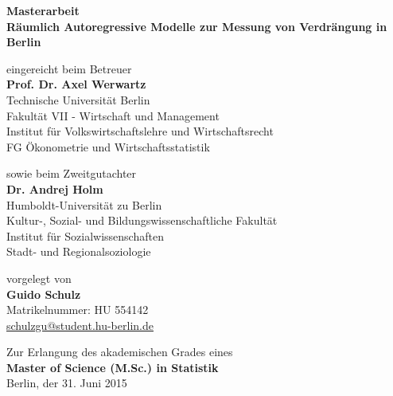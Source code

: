 \begin{center}
    {\normalsize{\bf Masterarbeit}} \\\vspace{0.5cm}
    {\LARGE{\bf Räumlich Autoregressive Modelle zur Messung von Verdrängung in Berlin}} \vspace{0.5cm}

    {\normalsize eingereicht beim Betreuer}\\\vspace{0.5cm}
    {\normalsize{\bf Prof. Dr. Axel Werwartz}} \\\vspace{0.5cm}
    {\normalsize Technische Universität Berlin \\
    Fakultät VII - Wirtschaft und Management \\
    Institut für Volkswirtschaftslehre und Wirtschaftsrecht \\
    FG Ökonometrie und Wirtschaftsstatistik} \vspace{1cm}

    {\normalsize sowie beim Zweitgutachter}\\\vspace{0.5cm}
    {\normalsize{\bf Dr. Andrej Holm}} \\\vspace{0.5cm}
    {\normalsize Humboldt-Universität zu Berlin \\
    Kultur-, Sozial- und Bildungswissenschaftliche Fakultät\\
    Institut für Sozialwissenschaften\\
    Stadt- und Regionalsoziologie} \vspace{1cm}

    {\normalsize vorgelegt von \\\vspace{0.5cm}
    {\bf Guido Schulz} \\
    Matrikelnummer: HU 554142 \\
    \href{mailto:schulzgu@student.hu-berlin.de}{schulzgu@student.hu-berlin.de}} \vspace{1cm}


    {\normalsize Zur Erlangung des akademischen Grades eines \\
    {\bf Master of Science (M.Sc.) in Statistik} \\
    Berlin, der 31. Juni 2015}

\end{center}
